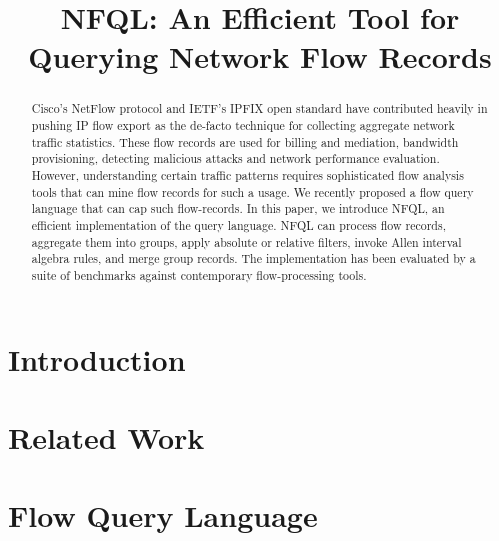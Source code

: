 \documentclass[conference]{IEEEtran}
\begin{document}
\title{NFQL: An Efficient Tool for Querying Network Flow Records}
\author{ }

\maketitle

\begin{acronym}
\end{acronym}


\begin{abstract} Cisco's NetFlow protocol and IETF's IPFIX open standard have
  contributed heavily in pushing IP flow export as the de-facto technique for
  collecting aggregate network traffic statistics. These flow records are used
  for billing and mediation, bandwidth provisioning, detecting malicious
  attacks and network performance evaluation. However, understanding certain
  traffic patterns requires sophisticated flow analysis tools that can mine
  flow records for such a usage. We recently proposed a flow query language
  that can cap such flow-records. In this paper, we introduce NFQL, an
  efficient implementation of the query language.  NFQL can process flow
  records, aggregate them into groups, apply absolute or relative filters,
  invoke Allen interval algebra rules, and merge group records. The
  implementation has been evaluated by a suite of benchmarks against
  contemporary flow-processing tools.\end{abstract}



\section{Introduction}
\label{sec:introduction}
\section{Related Work}
\label{sec:relatedwork}
\section{Flow Query Language}
\label{sec:design}
\end{document}
